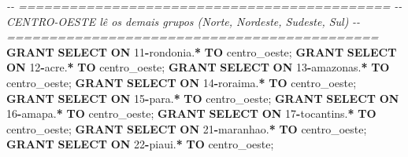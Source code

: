\documentclass[
]{book}
\newenvironment{Shaded}{\begin{snugshade}}{\end{snugshade}}
\newcommand{\CommentTok}[1]{\textcolor[rgb]{0.56,0.35,0.01}{\textit{#1}}}
\newcommand{\DecValTok}[1]{\textcolor[rgb]{0.00,0.00,0.81}{#1}}
\newcommand{\KeywordTok}[1]{\textcolor[rgb]{0.13,0.29,0.53}{\textbf{#1}}}
\newcommand{\NormalTok}[1]{#1}
\newcommand{\OperatorTok}[1]{\textcolor[rgb]{0.81,0.36,0.00}{\textbf{#1}}}
\newcommand{\StringTok}[1]{\textcolor[rgb]{0.31,0.60,0.02}{#1}}
\begin{document}
\begin{Shaded}
\begin{Highlighting}[]
\CommentTok{{-}{-} ============================================}
\CommentTok{{-}{-} CENTRO{-}OESTE lê os demais grupos (Norte, Nordeste, Sudeste, Sul)}
\CommentTok{{-}{-} ============================================}
\KeywordTok{GRANT} \KeywordTok{SELECT} \KeywordTok{ON}\NormalTok{ \textasciigrave{}}\DecValTok{11}\OperatorTok{{-}}\NormalTok{rondonia\textasciigrave{}.}\OperatorTok{*}           \KeywordTok{TO} \StringTok{\textquotesingle{}centro\_oeste\textquotesingle{}}\NormalTok{;}
\KeywordTok{GRANT} \KeywordTok{SELECT} \KeywordTok{ON}\NormalTok{ \textasciigrave{}}\DecValTok{12}\OperatorTok{{-}}\NormalTok{acre\textasciigrave{}.}\OperatorTok{*}               \KeywordTok{TO} \StringTok{\textquotesingle{}centro\_oeste\textquotesingle{}}\NormalTok{;}
\KeywordTok{GRANT} \KeywordTok{SELECT} \KeywordTok{ON}\NormalTok{ \textasciigrave{}}\DecValTok{13}\OperatorTok{{-}}\NormalTok{amazonas\textasciigrave{}.}\OperatorTok{*}           \KeywordTok{TO} \StringTok{\textquotesingle{}centro\_oeste\textquotesingle{}}\NormalTok{;}
\KeywordTok{GRANT} \KeywordTok{SELECT} \KeywordTok{ON}\NormalTok{ \textasciigrave{}}\DecValTok{14}\OperatorTok{{-}}\NormalTok{roraima\textasciigrave{}.}\OperatorTok{*}            \KeywordTok{TO} \StringTok{\textquotesingle{}centro\_oeste\textquotesingle{}}\NormalTok{;}
\KeywordTok{GRANT} \KeywordTok{SELECT} \KeywordTok{ON}\NormalTok{ \textasciigrave{}}\DecValTok{15}\OperatorTok{{-}}\NormalTok{para\textasciigrave{}.}\OperatorTok{*}               \KeywordTok{TO} \StringTok{\textquotesingle{}centro\_oeste\textquotesingle{}}\NormalTok{;}
\KeywordTok{GRANT} \KeywordTok{SELECT} \KeywordTok{ON}\NormalTok{ \textasciigrave{}}\DecValTok{16}\OperatorTok{{-}}\NormalTok{amapa\textasciigrave{}.}\OperatorTok{*}              \KeywordTok{TO} \StringTok{\textquotesingle{}centro\_oeste\textquotesingle{}}\NormalTok{;}
\KeywordTok{GRANT} \KeywordTok{SELECT} \KeywordTok{ON}\NormalTok{ \textasciigrave{}}\DecValTok{17}\OperatorTok{{-}}\NormalTok{tocantins\textasciigrave{}.}\OperatorTok{*}          \KeywordTok{TO} \StringTok{\textquotesingle{}centro\_oeste\textquotesingle{}}\NormalTok{;}
\KeywordTok{GRANT} \KeywordTok{SELECT} \KeywordTok{ON}\NormalTok{ \textasciigrave{}}\DecValTok{21}\OperatorTok{{-}}\NormalTok{maranhao\textasciigrave{}.}\OperatorTok{*}           \KeywordTok{TO} \StringTok{\textquotesingle{}centro\_oeste\textquotesingle{}}\NormalTok{;}
\KeywordTok{GRANT} \KeywordTok{SELECT} \KeywordTok{ON}\NormalTok{ \textasciigrave{}}\DecValTok{22}\OperatorTok{{-}}\NormalTok{piaui\textasciigrave{}.}\OperatorTok{*}              \KeywordTok{TO} \StringTok{\textquotesingle{}centro\_oeste\textquotesingle{}}\NormalTok{;}

\end{Highlighting}
\end{Shaded}
\end{document}
